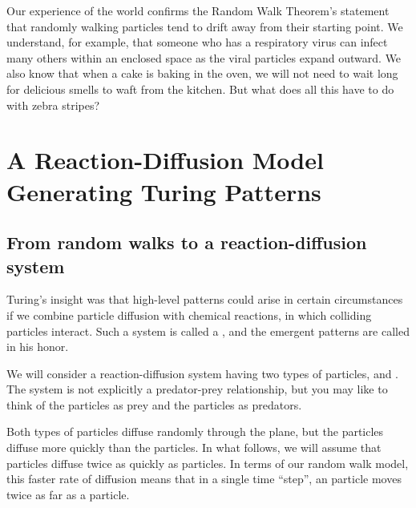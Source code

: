 Our experience of the world confirms the Random Walk Theorem's statement that randomly walking particles tend to drift away from their starting point. We understand, for example, that someone who has a respiratory virus can infect many others within an enclosed space as the viral particles expand outward. We also know that when a cake is baking in the oven, we will not need to wait long for delicious smells to waft from the kitchen. But what does all this have to do with zebra stripes?\\

\FloatBarrier
{}

\section{A Reaction-Diffusion Model Generating Turing Patterns}
\label{sec:a_reaction-diffusion_model_generating_turing_patterns}

\subsection{From random walks to a reaction-diffusion system}

Turing's insight was that high-level patterns could arise in certain circumstances if we combine particle diffusion with chemical reactions, in which colliding particles interact. Such a system is called a , and the emergent patterns are called  in his honor.

We will consider a reaction-diffusion system having two types of particles,  and . The system is not explicitly a predator-prey relationship, but you may like to think of the  particles as prey and the  particles as predators.

Both types of particles diffuse randomly through the plane, but the  particles diffuse more quickly than the  particles.  In what follows, we will assume that  particles diffuse twice as quickly as  particles. In terms of our random walk model, this faster rate of diffusion means that in a single time ``step'', an  particle moves twice as far as a  particle.\\

